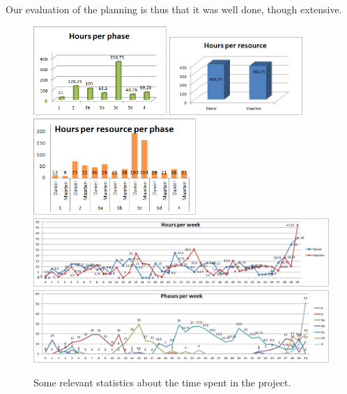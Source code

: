 Our evaluation of the planning is thus that it was well done, though extensive.
%
\begin{figure}[htb!]
	\centering
	\includegraphics[width=0.45\textwidth]{Figures/HoursPerPhase}
	\includegraphics[width=0.45\textwidth]{Figures/HoursPerResource}
	\includegraphics[width=0.55\textwidth]{Figures/HoursPerResourcePerPhase}
	\includegraphics[width=1.00\textwidth]{Figures/HoursPerWeek}
	\includegraphics[width=1.00\textwidth]{Figures/HoursPerPhasePerWeek}
	\caption{Some relevant statistics about the time spent in the project.
     }
	\label{fig:hour-statistics}
\end{figure}
